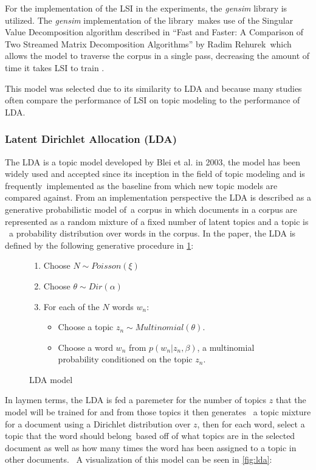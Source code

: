 \documentclass[letterpaper,12pt]{article}
\begin{document}
For the implementation of the LSI in the experiments, the \emph{gensim} \cite{gensim} library is utilized. The \emph{gensim} implementation of the library\
makes use of the Singular Value Decomposition algorithm described in ``Fast and Faster: A Comparison of Two Streamed Matrix Decomposition Algorithms'' by Radim Rehurek\
which allows the model to traverse the corpus in a single pass, decreasing the amount of time it takes LSI to train \cite{rehurek2011}.

This model was selected due to its similarity to LDA and because many studies often compare the performance of LSI on topic modeling to the performance of LDA.

\subsubsection{Latent Dirichlet Allocation (LDA)}
The LDA is a topic model developed by Blei et al. in 2003, the model has been widely used and accepted since its inception in the field of topic modeling and is frequently\
implemented as the baseline from which new topic models are compared against. From an implementation perspective the LDA is described as a generative probabilistic model of\
a corpus in which documents in a corpus are represented as a random mixture of a fixed number of latent topics and a topic is \
a probability distribution over words in the corpus. In the paper, the LDA is defined by the following generative procedure in \ref{eqn:lda}:

\begin{figure}
	\begin{enumerate}
		\item Choose $N \sim Poisson(\xi)$
		\item Choose $\theta \sim Dir(\alpha)$
		\item For each of the $N$ words $w_n$:
		\begin{itemize}
			\item Choose a topic $z_n \sim Multinomial(\theta)$.
			\item Choose a word $w_n$ from $p(w_n|z_n,\beta)$, a multinomial probability conditioned on the topic $z_n$.
		\end{itemize}
	\end{enumerate}
	\caption{LDA model \cite{blei2003latent}}
	\label{eqn:lda}
\end{figure}

In laymen terms, the LDA is fed a paremeter for the number of topics $z$ that the model will be trained for and from those topics it then generates \
a topic mixture for a document using a Dirichlet distribution over $z$, then for each word, select a topic that the word should belong\
based off of what topics are in the selected document as well as how many times the word has been assigned to a topic in other documents. \
A visualization of this model can be seen in \ref{fig:lda}: 
\end{document}
